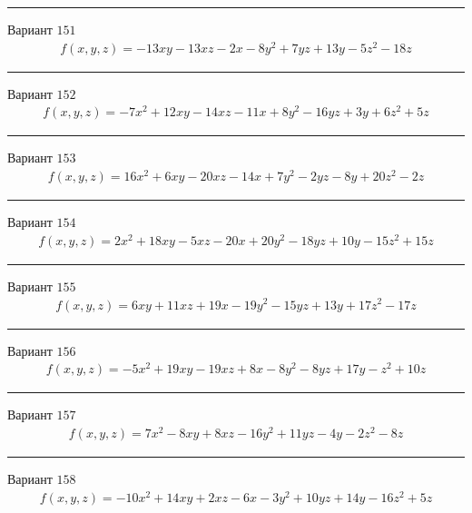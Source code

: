 \documentclass[11pt]{report}
\begin{document}
\begin{center}
\noindent\rule{8cm}{0.4pt}
\end{center}
Вариант $151$
\begin{align*}
    f(x, y, z) = - 13 x y - 13 x z - 2 x - 8 y^{2} + 7 y z + 13 y - 5 z^{2} - 18 z
\end{align*}
\begin{center}
\noindent\rule{8cm}{0.4pt}
\end{center}
Вариант $152$
\begin{align*}
    f(x, y, z) = - 7 x^{2} + 12 x y - 14 x z - 11 x + 8 y^{2} - 16 y z + 3 y + 6 z^{2} + 5 z
\end{align*}
\begin{center}
\noindent\rule{8cm}{0.4pt}
\end{center}
Вариант $153$
\begin{align*}
    f(x, y, z) = 16 x^{2} + 6 x y - 20 x z - 14 x + 7 y^{2} - 2 y z - 8 y + 20 z^{2} - 2 z
\end{align*}
\begin{center}
\noindent\rule{8cm}{0.4pt}
\end{center}
Вариант $154$
\begin{align*}
    f(x, y, z) = 2 x^{2} + 18 x y - 5 x z - 20 x + 20 y^{2} - 18 y z + 10 y - 15 z^{2} + 15 z
\end{align*}
\begin{center}
\noindent\rule{8cm}{0.4pt}
\end{center}
Вариант $155$
\begin{align*}
    f(x, y, z) = 6 x y + 11 x z + 19 x - 19 y^{2} - 15 y z + 13 y + 17 z^{2} - 17 z
\end{align*}
\begin{center}
\noindent\rule{8cm}{0.4pt}
\end{center}
Вариант $156$
\begin{align*}
    f(x, y, z) = - 5 x^{2} + 19 x y - 19 x z + 8 x - 8 y^{2} - 8 y z + 17 y - z^{2} + 10 z
\end{align*}
\begin{center}
\noindent\rule{8cm}{0.4pt}
\end{center}
Вариант $157$
\begin{align*}
    f(x, y, z) = 7 x^{2} - 8 x y + 8 x z - 16 y^{2} + 11 y z - 4 y - 2 z^{2} - 8 z
\end{align*}
\begin{center}
\noindent\rule{8cm}{0.4pt}
\end{center}
Вариант $158$
\begin{align*}
    f(x, y, z) = - 10 x^{2} + 14 x y + 2 x z - 6 x - 3 y^{2} + 10 y z + 14 y - 16 z^{2} + 5 z
\end{align*}
\end{document}
